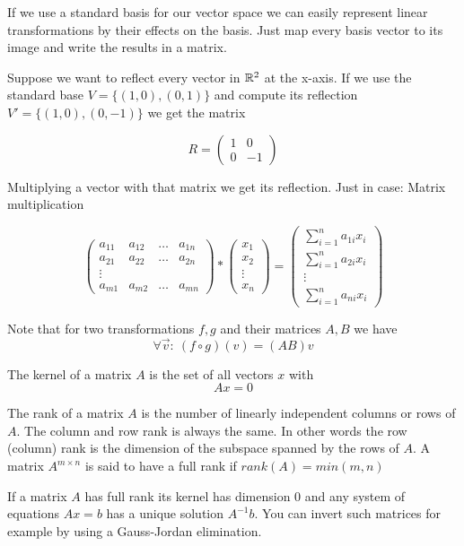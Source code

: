 If we use a standard basis for our vector space we can easily represent linear transformations by their effects on the basis. Just map every basis vector to its image and write the results in a matrix. 

\begin{Ex}[Reflection] Suppose we want to reflect every vector in $\mathbb{R}^2$ at the x-axis. If we use the standard base $V = \{(1,0),(0,1)\}$ and compute its reflection $V'=\{(1,0),(0,-1)\}$ we get the matrix

\[R = \begin{pmatrix}
1 & 0 \\
0 & -1
\end{pmatrix}\]

Multiplying a vector with that matrix we get its reflection. Just in case: Matrix multiplication

\[\begin{pmatrix}
a_{11} & a_{12} & \ldots & a_{1n}\\
a_{21} & a_{22} & \ldots & a_{2n}\\
\vdots \\
a_{m1} & a_{m2} & \ldots & a_{mn}
\end{pmatrix} * \begin{pmatrix}x_1\\x_2\\\vdots\\x_n\end{pmatrix} =\begin{pmatrix} \sum_{i=1}^n a_{1i}x_i\\ \sum_{i=1}^n a_{2i}x_i\\\vdots\\\sum_{i=1}^n a_{ni}x_i\end{pmatrix}\]

\end{Ex}

Note that for two transformations $f,g$ and their matrices $A,B$ we have
\[\forall \vec v:\ (f\circ g)(v) = (AB)v\]

\begin{Def} 
 The kernel of a matrix $A$ is the set of all vectors $x$ with
$$Ax=0$$
\end{Def}

\begin{Def}
 The rank of a matrix $A$ is the number of linearly independent columns or rows of $A$. The column and row rank is always the same. In other words the row (column) rank is the dimension of the subspace spanned by the rows of $A$. A matrix $A^{m \times n}$ is said to have a full rank if $rank(A)=min(m,n)$
\end{Def}

If a matrix $A$ has full rank its kernel has dimension 0 and any system of equations $A x=b$ has a unique solution $A^{-1}b$. You can invert such matrices for example by using a Gauss-Jordan elimination.



